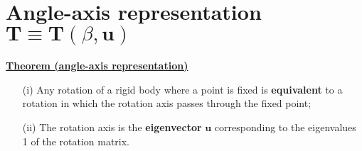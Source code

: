 \documentclass[a4paper, 12pt]{article}
\begin{document}
\vspace{-0.5cm}
\section*{Angle-axis representation $\mathbf{T} \equiv \mathbf{T}(\beta, \mathbf{u})$}
{
    \small{
\textbf{\underline{Theorem (angle-axis representation)}}
            \begin{itemize}
                \itemsep0em
                \item[(i)] Any rotation of a rigid body where a point is fixed is \textbf{equivalent} to a rotation in which the rotation axis passes through the fixed point; 
                \item[(ii)] The rotation axis is the \textbf{eigenvector} $\mathbf{u}$ corresponding to the eigenvalues 1 of the rotation matrix. 
                \vspace{0.2cm}
            \end{itemize} 
}
}

\vspace{-1cm}
\end{document}
